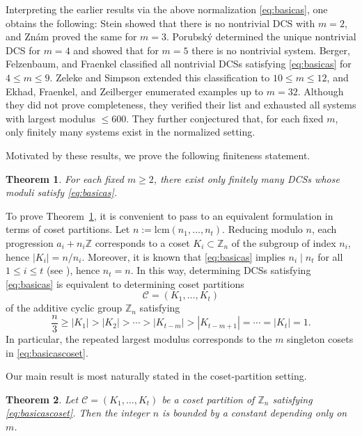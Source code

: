 \documentclass[11pt,reqno]{amsart}
\newtheorem{theorem}{Theorem}[section]
\theoremstyle{definition}
\newcommand{\Z}{\mathbb{Z}}
\newcommand{\Cset}{\mathcal{C}}
\begin{document}
Interpreting the earlier results via the above normalization \eqref{eq:basicas}, one obtains the following:
Stein \cite{Stein} showed that there is no nontrivial DCS with \(m=2\), and Zn\'am \cite{Znam1969,Znam1984} proved the same for \(m=3\).
Porubsk\'y \cite{Porubsky} determined the unique nontrivial DCS for \(m=4\) and showed that for \(m=5\) there is no nontrivial system.
Berger, Felzenbaum, and Fraenkel \cite{BFF} classified all nontrivial DCSs satisfying \eqref{eq:basicas} for \(4\le m\le 9\). Zeleke and Simpson \cite{ZS} extended this classification to \(10\le m\le 12\), and Ekhad, Fraenkel, and Zeilberger \cite{EFZ} enumerated examples up to \(m=32\).
Although they did not prove completeness, they verified their list and exhausted all systems with largest modulus \(\le 600\).
They further conjectured that, for each fixed \(m\), only finitely many systems exist in the normalized setting.

Motivated by these results, we prove the following finiteness statement.

\begin{theorem}\label{thm:main-dcs}
For each fixed \(m\ge 2\), there exist only finitely many DCSs whose moduli satisfy
\eqref{eq:basicas}.
\end{theorem}

To prove Theorem~\ref{thm:main-dcs}, it is convenient to pass to an equivalent formulation in terms of coset partitions.
Let \(n:=\mathrm{lcm}(n_1,\dots,n_t)\). Reducing modulo \(n\), each progression \(a_i+n_i\Z\) corresponds to a coset
\(K_i\subset \Z_n\) of the subgroup of index \(n_i\), hence \(|K_i|=n/n_i\). Moreover, it is known that \eqref{eq:basicas} implies \(n_i \mid n_t\) for all \( 1\le i \le t\) (see \cite{BFF}), hence \(n_t = n\). In this way, determining DCSs satisfying
\eqref{eq:basicas} is equivalent to determining coset partitions
\[
\Cset=(K_1,\ldots,K_t)
\]
of the additive cyclic group \(\Z_n\) satisfying
\begin{equation}\label{eq:basicascoset}
\frac{n}{3} \ge |K_1| > |K_2| > \cdots > |K_{t-m}| > |K_{t-m+1}|=\cdots=|K_t| = 1.
\end{equation}
In particular, the repeated largest modulus corresponds to the \(m\) singleton cosets in \eqref{eq:basicascoset}.

Our main result is most naturally stated in the coset-partition setting.

\begin{theorem}\label{thm:main-coset}
Let \(\Cset=(K_1,\ldots,K_t)\) be a coset partition of \(\Z_n\) satisfying \eqref{eq:basicascoset}.
Then the integer \(n\) is bounded by a constant depending only on \(m\).
\end{theorem}
\end{document}
